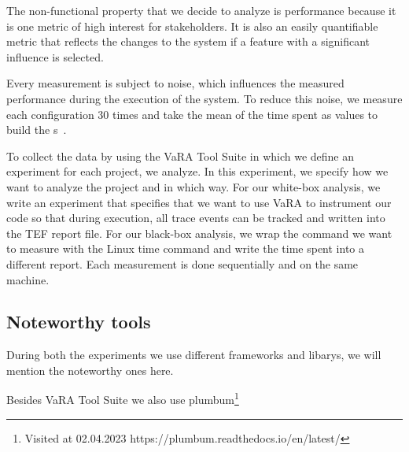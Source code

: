 The non-functional property that we decide to analyze is performance because it is one metric of high interest for stakeholders. 
It is also an easily quantifiable metric that reflects the changes to the system if a feature with a significant influence is selected.

Every measurement is subject to noise, which influences the measured performance during the execution of the system. 
To reduce this noise, we measure each configuration 30 times and take the mean of the time spent as values to build the {\perfInfluenceModel}s~\cite{SampleSize}.

To collect the data by using the VaRA Tool Suite in which we define an experiment for each project, we analyze. 
In this experiment, we specify how we want to analyze the project and in which way. For our white-box analysis, 
we write an experiment that specifies that we want to use VaRA to instrument our code so that during execution, 
all trace events can be tracked and written into the TEF report file. For our black-box analysis, 
we wrap the command we want to measure with the Linux time command and write the time spent into a different report. 
Each measurement is done sequentially and on the same machine. 

\subsection*{Noteworthy tools}
During both the experiments we use different frameworks and libarys, we will mention the noteworthy ones here.

Besides VaRA Tool Suite we also use plumbum\footnote{Visited at 02.04.2023 https://plumbum.readthedocs.io/en/latest/}
